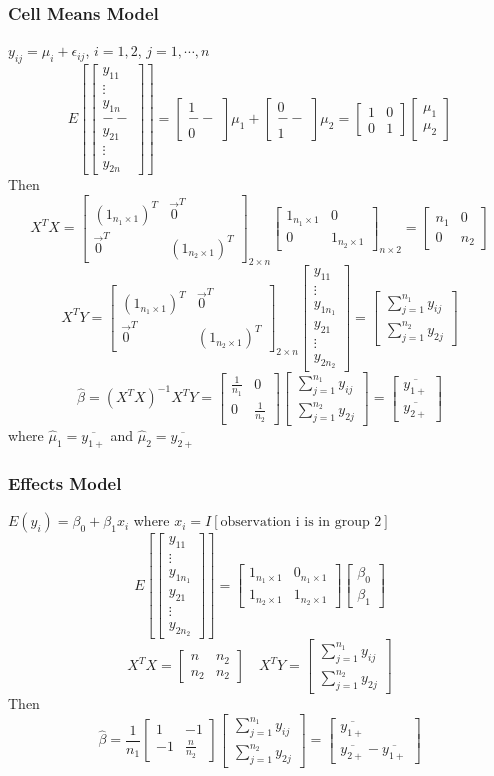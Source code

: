 \documentclass[11pt]{article}
\newcommand{\cv}[1]{\begin{bmatrix} #1 \end{bmatrix}}
\begin{document}
\subsubsection*{Cell Means Model}
$y_{ij} = \mu_i+\epsilon_{ij}$, $i=1,2$, $j=1,\cdots,n$
\[E\left[\cv{y_{11}\\\vdots\\y_{1n}\\--\\y_{21}\\\vdots\\y_{2n}}\right] = \cv{1\\--\\0}\mu_1 + \cv{0\\--\\1}\mu_2 = \cv{1&0\\0&1}\cv{\mu_1\\\mu_2}\]
Then 
\[X^TX = \cv{(1_{n_1\times 1})^T &\vec{0}^T \\ \vec{0}^T &(1_{n_2\times 1})^T}_{2\times n}\cv{1_{n_1\times 1}&0 \\0&1_{n_2\times 1}}_{n\times 2} = \cv{n_1&0\\0&n_2}\]
\[X^TY = \cv{(1_{n_1\times 1})^T &\vec{0}^T \\ \vec{0}^T &(1_{n_2\times 1})^T}_{2\times n}\cv{y_{11}\\\vdots\\y_{1n_1}\\y_{21}\\\vdots\\y_{2n_2}} = \cv{\sum_{j=1}^{n_1}y_{ij} \\\sum_{j=1}^{n_2}y_{2j}}\]
\[\hat\beta = (X^TX)^{-1}X^TY = \cv{\frac{1}{n_1} &0 \\0 &\frac{1}{n_2}}\cv{\sum_{j=1}^{n_1}y_{ij} \\\sum_{j=1}^{n_2}y_{2j}} = \cv{\overline{y_{1+}} \\\overline{y_{2+}}}\]
where $\hat\mu_1 = \overline{y_{1+}}$ and $\hat\mu_2 = \overline{y_{2+}}$
\subsubsection*{Effects Model}
$E(y_i) = \beta_0 + \beta_1x_i$ where $x_i = I[\text{observation i is in group 2}]$
\[E\left[\cv{y_{11}\\\vdots\\y_{1n_1}\\y_{21}\\\vdots\\y_{2n_2}}\right] = \cv{1_{n_1\times 1} &0_{n_1\times 1}\\1_{n_2\times 1} &1_{n_2\times 1}}\cv{\beta_0 \\\beta_1}\]
\[X^TX = \cv{n &n_2\\n_2 &n_2}\quad X^TY = \cv{\sum_{j=1}^{n_1}y_{ij} \\ \sum_{j=1}^{n_2}y_{2j}}\]
Then \[\hat\beta = \frac{1}{n_1}\cv{1 &-1\\ -1 &\frac{n}{n_2}}\cv{\sum_{j=1}^{n_1}y_{ij} \\ \sum_{j=1}^{n_2}y_{2j}} = \cv{\overline{y_{1+}} \\ \overline{y_{2+}} - \overline{y_{1+}}}\]
\end{document}
